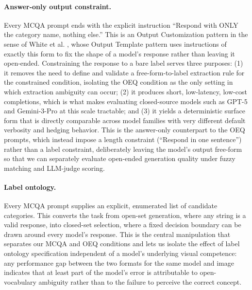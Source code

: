 \documentclass[10pt,letterpaper]{article}
\begin{document}
\paragraph{Answer-only output constraint.} Every MCQA prompt ends with the explicit instruction ``Respond with ONLY the category name, nothing else.'' This is an Output Customization pattern in the sense of White et al. \cite{white_prompt_2023}, whose Output Template pattern uses instructions of exactly this form to fix the shape of a model's response rather than leaving it open-ended. Constraining the response to a bare label serves three purposes: (1) it removes the need to define and validate a free-form-to-label extraction rule for the constrained condition, isolating the OEQ condition as the only setting in which extraction ambiguity can occur; (2) it produces short, low-latency, low-cost completions, which is what makes evaluating closed-source models such as GPT-5 and Gemini-3-Pro at this scale tractable; and (3) it yields a deterministic surface form that is directly comparable across model families with very different default verbosity and hedging behavior. This is the answer-only counterpart to the OEQ prompts, which instead impose a length constraint (``Respond in one sentence'') rather than a label constraint, deliberately leaving the model's output free-form so that we can separately evaluate open-ended generation quality under fuzzy matching and LLM-judge scoring.

\paragraph{Label ontology.} Every MCQA prompt supplies an explicit, enumerated list of candidate categories. This converts the task from open-set generation, where any string is a valid response, into closed-set selection, where a fixed decision boundary can be drawn around every model's response. This is the central manipulation that separates our MCQA and OEQ conditions and lets us isolate the effect of label ontology specification independent of a model's underlying visual competence: any performance gap between the two formats for the same model and image indicates that at least part of the model's error is attributable to open-vocabulary ambiguity rather than to the failure to perceive the correct concept.
\end{document}

